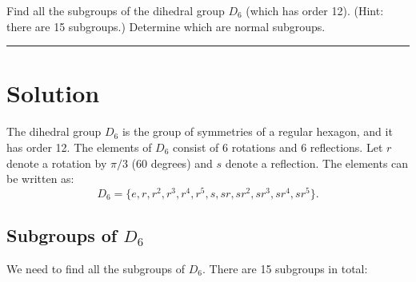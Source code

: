 \documentclass[12pt]{amsart}
\theoremstyle{definition}
\numberwithin{equation}{section}
\begin{document}
\begin{exercise}{2} Find all the subgroups of the dihedral group \(D_6\) (which has order 12). (Hint: there are 15 subgroups.) Determine which are normal subgroups.

    \noindent\rule{\linewidth}{1pt}
    
    \section*{Solution}

    The dihedral group \(D_6\) is the group of symmetries of a regular hexagon, and it has order 12. The elements of \(D_6\) consist of 6 rotations and 6 reflections. Let \(r\) denote a rotation by \(\pi/3\) (60 degrees) and \(s\) denote a reflection. The elements can be written as:
    \[
    D_6 = \{ e, r, r^2, r^3, r^4, r^5, s, sr, sr^2, sr^3, sr^4, sr^5 \}.
    \]

    \subsection*{Subgroups of \(D_6\)}

    We need to find all the subgroups of \(D_6\). There are 15 subgroups in total:


\end{exercise}
\end{document}
